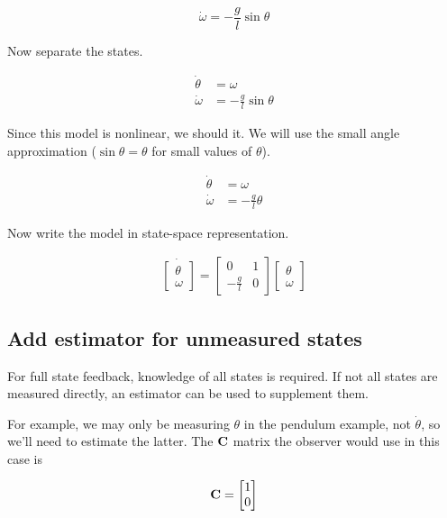 \begin{equation*}
  \dot{\omega} = -\frac{g}{l}\sin\theta
\end{equation*}

Now separate the states.

\begin{align*}
  \dot{\theta} &= \omega \\
  \dot{\omega} &= -\frac{g}{l} \sin\theta
\end{align*}

Since this \gls{model} is nonlinear, we should
  it.
We will use the small angle approximation ($\sin\theta = \theta$ for small
values of $\theta$).

\begin{align*}
  \dot{\theta} &= \omega \\
  \dot{\omega} &= -\frac{g}{l} \theta
\end{align*}

Now write the model in state-space representation.

\begin{align}
  \dot{
  \begin{bmatrix}
    \theta \\
    \omega
  \end{bmatrix}} =
  \begin{bmatrix}
    0 & 1 \\
    -\frac{g}{l} & 0
  \end{bmatrix}
  \begin{bmatrix}
    \theta \\
    \omega
  \end{bmatrix}
\end{align}

\subsection{Add estimator for unmeasured states}

For full state feedback, knowledge of all states is required. If not all states
are measured directly, an estimator can be used to supplement them.

For example, we may only be measuring $\theta$ in the pendulum example, not
$\dot{\theta}$, so we'll need to estimate the latter. The $\mathbf{C}$ matrix the
observer would use in this case is

\begin{equation*}
  \mathbf{C} = \begin{bmatrix}
    1 \\
    0
  \end{bmatrix}
\end{equation*}

